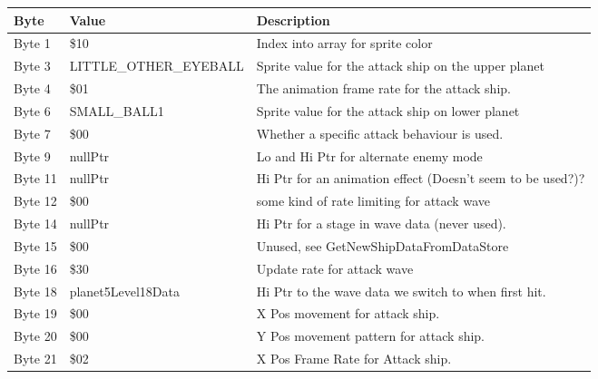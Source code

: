 \begin{figure}[H]
  {
  \setlength{\tabcolsep}{3.0pt}
  \setlength\cmidrulewidth{\heavyrulewidth} %
  \begin{adjustbox}{width=12cm}

\begin{tabular}{lll}
\toprule
 Byte    & Value                     & Description                                                        \\
\midrule
 Byte 1  & \$10                       & Index into array for sprite color                                  \\
 Byte 3  & LITTLE\_OTHER\_EYEBALL      & Sprite value for the attack ship on the upper planet               \\
 Byte 4  & \$01                       & The animation frame rate for the attack ship.                      \\
 Byte 6  & SMALL\_BALL1               & Sprite value for the attack ship on lower planet                   \\
 Byte 7  & \$00                       & Whether a specific attack behaviour is used.                       \\
 Byte 9  & nullPtr                   & Lo and Hi Ptr for alternate enemy mode                             \\
 Byte 11 & nullPtr                   & Hi Ptr for an animation effect (Doesn't seem to be used?)?         \\
 Byte 12 & \$00                       & some kind of rate limiting for attack wave                         \\
 Byte 14 & nullPtr                   & Hi Ptr for a stage in wave data (never used).                      \\
 Byte 15 & \$00                       & Unused, see GetNewShipDataFromDataStore                            \\
 Byte 16 & \$30                       & Update rate for attack wave                                        \\
 Byte 18 & planet5Level18Data        & Hi Ptr to the wave data we switch to when first hit.               \\
 Byte 19 & \$00                       & X Pos movement for attack ship.                                    \\
 Byte 20 & \$00                       & Y Pos movement pattern for attack ship.                            \\
 Byte 21 & \$02                       & X Pos Frame Rate for Attack ship.                                  \\

\end{tabular}
\end{adjustbox}}
\end{figure}
